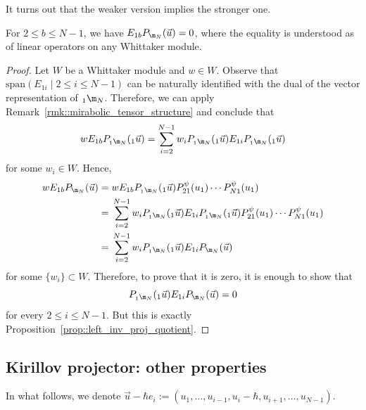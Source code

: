 	It turns out that the weaker version implies the stronger one.
	\begin{Proposition}
		For $2 \leq b \leq N-1$, we have
		$
		E_{1b} P_{\m_N}(\vec{u}) = 0$,
		where the equality is understood as of linear operators on any Whittaker module.
		\begin{proof}
			Let $W$ be a Whittaker module and $w\in W$. Observe that $\mathrm{span}(E_{1i}\mid 2 \leq i \leq N-1)$ can be naturally identified with the dual of the vector representation of ${}_1 \m_N$. Therefore, we can apply Remark~\ref{rmk::mirabolic_tensor_structure} and conclude that
			\begin{align*}
				w E_{1b}P_{{}_1\m_N}({}_1\vec{u}) = \sum\limits_{i=2}^{N-1} w_i P_{{}_1\m_N}({}_1\vec{u}) E_{1i} P_{{}_1\m_N}({}_1\vec{u})
			\end{align*}
			for some $w_i \in W$. Hence,
			\begin{align*}
				w E_{1b} P_{\m_N}(\vec{u})
				={}&w E_{1b}P_{{}_1\m_N}({}_1\vec{u}) P_{21}^{\psi}(u_1) \cdots P_{N1}^{\psi}(u_1) \\
				={}& \sum\limits_{i=2}^{N-1} w_i P_{{}_1\m_N}({}_1\vec{u}) E_{1i} P_{{}_1\m_N}({}_1\vec{u}) P_{21}^{\psi}(u_1) \cdots P_{N1}^{\psi}(u_1) \\
				={}&\sum\limits_{i=2}^{N-1} w_i P_{{}_1\m_N}({}_1\vec{u}) E_{1i} P_{\m_N}(\vec{u})
			\end{align*}
			for some $\{w_i\}\subset W$. Therefore, to prove that it is zero, it is enough to show that
			\[
			P_{{}_1\m_N}({}_1\vec{u}) E_{1i} P_{\m_N}(\vec{u}) = 0
			\]
			for every $2\leq i \leq N-1$. But this is exactly Proposition~\ref{prop::left_inv_proj_quotient}.
		\end{proof}
	\end{Proposition}
	
	\subsection{Kirillov projector: other properties}
	\label{subsect::kirillov_proj_last_col}
	
	In what follows, we denote
$
	\vec{u} - \hbar e_i := (u_1,\dots, u_{i-1},u_i - \hbar, u_{i+1},\dots,u_{N-1})$.
	
